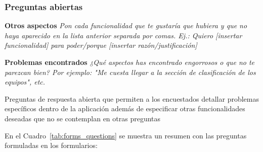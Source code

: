 \subsubsection*{Preguntas abiertas}

\textbf{Otros aspectos}
\emph{Pon cada funcionalidad que te gustaría que hubiera y que no haya aparecido en la lista anterior separada por comas. Ej.: Quiero [insertar funcionalidad] para poder/porque [insertar razón/justificación]}

\textbf{Problemas encontrados}
\emph{¿Qué aspectos has encontrado engorrosos o que no te parezcan bien? Por ejemplo: "Me cuesta llegar a la sección de clasificación de los equipos", etc.}

Preguntas de respuesta abierta que permiten a los encuestados detallar problemas específicos dentro de la aplicación además de especificar otras funcionalidades deseadas que no se contemplan en otras preguntas

En el Cuadro~\ref{tab:forms_questions} se muestra un resumen con las preguntas formuladas en los formularios:

